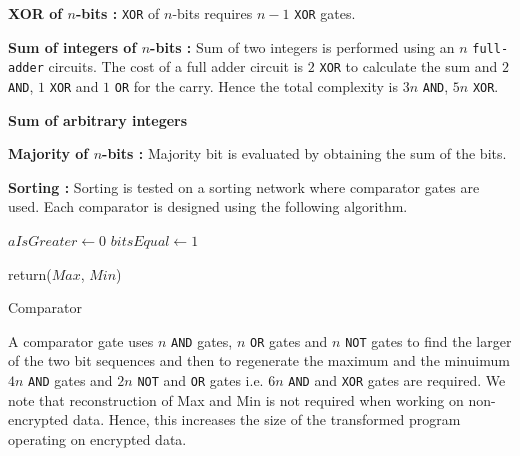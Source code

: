 \documentclass{acm_proc_article-sp}
\begin{document}
\textbf{XOR of $n$-bits :} \texttt{XOR} of $n$-bits requires $n-1$ \texttt{XOR} gates. 

\textbf{Sum of integers of $n$-bits :} Sum of two integers is performed using an $n$ \texttt{full-adder} circuits. The cost of a full adder circuit is $2$ \texttt{XOR} to calculate the sum and $2$ \texttt{AND}, $1$ \texttt{XOR} and $1$ \texttt{OR} for the carry. Hence the total complexity is $3n$ \texttt{AND}, $5n$ \texttt{XOR}. 

\textbf{Sum of arbitrary integers}

\textbf{Majority of $n$-bits :} Majority bit is evaluated by obtaining the sum of the bits.

\textbf{Sorting :}
Sorting is tested on a sorting network where comparator gates are used. Each comparator is designed using the following algorithm. 


\linesnumbered

\begin{algorithm}[H]

 \SetVline



 $aIsGreater \leftarrow 0$\;
 $bitsEqual \leftarrow 1$\;

	




return($Max$, $Min$)

 \caption{Comparator\label{Code:algo}}

\end{algorithm}



A comparator gate uses $n$ \texttt{AND} gates, $n$ \texttt{OR} gates and $n$ \texttt{NOT} gates to find the larger of the two bit sequences and then to regenerate the maximum and the minuimum $4n$ \texttt{AND} gates and $2n$ \texttt{NOT} and \texttt{OR} gates i.e. $6n$ \texttt{AND} and \texttt{XOR} gates are required. We note that reconstruction of Max and  Min is not required when working on non-encrypted data. Hence, this increases the size of the transformed program operating on encrypted data.
\end{document}

